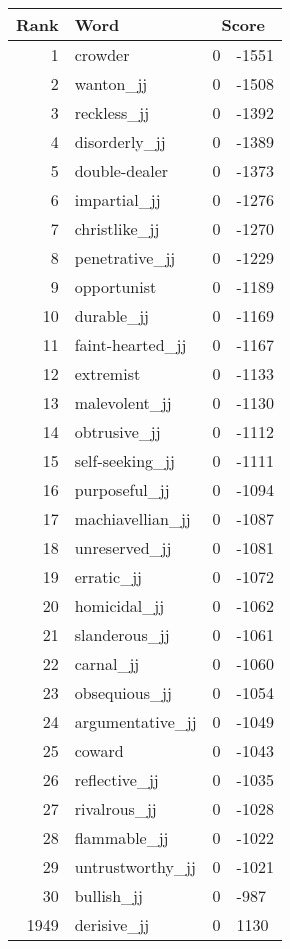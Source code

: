 \begin{longtable}[!htbp]{| rlr@{.}l |}
    \hline
    \textbf{Rank} & \textbf{Word} & \multicolumn{2}{c|}{\textbf{Score}} \\
    \hline
    \endhead
    1 & crowder & 0 & -1551 \\
    2 & wanton\_jj & 0 & -1508 \\
    3 & reckless\_jj & 0 & -1392 \\
    4 & disorderly\_jj & 0 & -1389 \\
    5 & double-dealer & 0 & -1373 \\
    6 & impartial\_jj & 0 & -1276 \\
    7 & christlike\_jj & 0 & -1270 \\
    8 & penetrative\_jj & 0 & -1229 \\
    9 & opportunist & 0 & -1189 \\
    10 & durable\_jj & 0 & -1169 \\
    11 & faint-hearted\_jj & 0 & -1167 \\
    12 & extremist & 0 & -1133 \\
    13 & malevolent\_jj & 0 & -1130 \\
    14 & obtrusive\_jj & 0 & -1112 \\
    15 & self-seeking\_jj & 0 & -1111 \\
    16 & purposeful\_jj & 0 & -1094 \\
    17 & machiavellian\_jj & 0 & -1087 \\
    18 & unreserved\_jj & 0 & -1081 \\
    19 & erratic\_jj & 0 & -1072 \\
    20 & homicidal\_jj & 0 & -1062 \\
    21 & slanderous\_jj & 0 & -1061 \\
    22 & carnal\_jj & 0 & -1060 \\
    23 & obsequious\_jj & 0 & -1054 \\
    24 & argumentative\_jj & 0 & -1049 \\
    25 & coward & 0 & -1043 \\
    26 & reflective\_jj & 0 & -1035 \\
    27 & rivalrous\_jj & 0 & -1028 \\
    28 & flammable\_jj & 0 & -1022 \\
    29 & untrustworthy\_jj & 0 & -1021 \\
    30 & bullish\_jj & 0 & -987 \\
    1949 & derisive\_jj & 0 & 1130 \\

\end{longtable}
